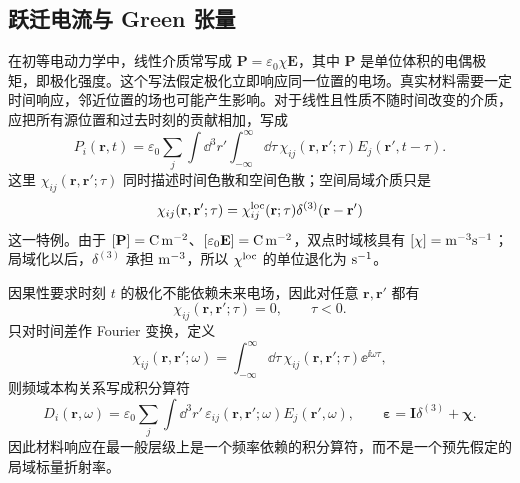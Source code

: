 \subsection{跃迁电流与 Green 张量}

在初等电动力学中，线性介质常写成 $\mathbf P=\varepsilon_0\chi\mathbf E$，其中 $\mathbf P$ 是单位体积的电偶极矩，即极化强度。这个写法假定极化立即响应同一位置的电场。真实材料需要一定时间响应，邻近位置的场也可能产生影响。对于线性且性质不随时间改变的介质，应把所有源位置和过去时刻的贡献相加，写成
\begin{equation}
\boxed{
P_i(\mathbf r,t)
=\varepsilon_0\sum_j
\int\dd^3r'\int_{-\infty}^{\infty}\dd\tau\,
\chi_{ij}(\mathbf r,\mathbf r';\tau)
E_j(\mathbf r',t-\tau).}
\label{eq:general_nonlocal_causal_susceptibility}
\end{equation}
这里 $\chi_{ij}(\mathbf r,\mathbf r';\tau)$ 同时描述时间色散和空间色散；空间局域介质只是
\[
\chi_{ij}(\mathbf r,\mathbf r';\tau)
=\chi_{ij}^{\rm loc}(\mathbf r;\tau)
\delta^{(3)}(\mathbf r-\mathbf r')
\]
这一特例。由于 $[\mathbf P]={\rm C\,m^{-2}}$、$[\varepsilon_0\mathbf E]={\rm C\,m^{-2}}$，双点时域核具有 $[\chi]={\rm m^{-3}s^{-1}}$；局域化以后，$\delta^{(3)}$ 承担 ${\rm m^{-3}}$，所以 $\chi^{\rm loc}$ 的单位退化为 ${\rm s^{-1}}$。

因果性要求时刻 $t$ 的极化不能依赖未来电场，因此对任意 $\mathbf r,\mathbf r'$ 都有
\begin{equation}
\boxed{
\chi_{ij}(\mathbf r,\mathbf r';\tau)=0,
\qquad \tau<0.}
\label{eq:causal_material_response_support}
\end{equation}
只对时间差作 Fourier 变换，定义
\[
\chi_{ij}(\mathbf r,\mathbf r';\omega)
=\int_{-\infty}^{\infty}\dd\tau\,
\chi_{ij}(\mathbf r,\mathbf r';\tau)\ee^{\ii\omega\tau},
\]
则频域本构关系写成积分算符
\begin{equation}
\boxed{
D_i(\mathbf r,\omega)
=\varepsilon_0\sum_j\int\dd^3r'\,
\varepsilon_{ij}(\mathbf r,\mathbf r';\omega)
E_j(\mathbf r',\omega),
\qquad
\boldsymbol\varepsilon=\mathbf I\delta^{(3)}+\boldsymbol\chi.}
\label{eq:nonlocal_permittivity_kernel}
\end{equation}
因此材料响应在最一般层级上是一个频率依赖的积分算符，而不是一个预先假定的局域标量折射率。

